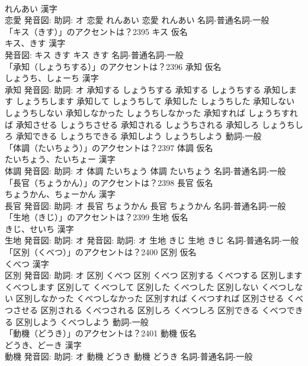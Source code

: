 \documentclass[8pt]{extreport}
\begin{document}
\begin{CJK}{UTF8}{min}
\\	れんあい 漢字　
\\	恋愛 発音図: 助詞: オ	恋愛 れんあい		恋愛 れんあい				名詞-普通名詞-一般 
\\	「キス（きす）」のアクセントは？2395	キス 仮名　
\\	キス、きす 漢字　
\\	発音図:	キス きす		キス きす				名詞-普通名詞-一般 
\\	「承知（しょうちする）」のアクセントは？2396	承知 仮名　
\\	しょうち、しょーち 漢字　
\\	承知 発音図: 助詞: オ	承知する しょうちする		承知する しょうちする 承知します しょうちします 承知して しょうちして 承知した しょうちした 承知しない しょうちしない 承知しなかった しょうちしなかった 承知すれば しょうちすれば 承知させる しょうちさせる 承知される しょうちされる 承知しろ しょうちしろ 承知できる しょうちできる 承知しよう しょうちしよう				動詞-一般 
\\	「体調（たいちょう）」のアクセントは？2397	体調 仮名　
\\	たいちょう、たいちょー 漢字　
\\	体調 発音図: 助詞: オ	体調 たいちょう		体調 たいちょう				名詞-普通名詞-一般 
\\	「長官（ちょうかん）」のアクセントは？2398	長官 仮名　
\\	ちょうかん、ちょーかん 漢字　
\\	長官 発音図: 助詞: オ	長官 ちょうかん		長官 ちょうかん				名詞-普通名詞-一般 
\\	「生地（きじ）」のアクセントは？2399	生地 仮名　
\\	きじ、せいち 漢字　
\\	生地 発音図: 助詞: オ 発音図: 助詞: オ	生地 きじ		生地 きじ				名詞-普通名詞-一般 
\\	「区別（くべつ）」のアクセントは？2400	区別 仮名　
\\	くべつ 漢字　
\\	区別 発音図: 助詞: オ	区別 くべつ		区別 くべつ 区別する くべつする 区別します くべつします 区別して くべつして 区別した くべつした 区別しない くべつしない 区別しなかった くべつしなかった 区別すれば くべつすれば 区別させる くべつさせる 区別される くべつされる 区別しろ くべつしろ 区別できる くべつできる 区別しよう くべつしよう				動詞-一般 
\\	「動機（どうき）」のアクセントは？2401	動機 仮名　
\\	どうき、どーき 漢字　
\\	動機 発音図: 助詞: オ	動機 どうき		動機 どうき				名詞-普通名詞-一般 

\end{CJK}
\end{document}
